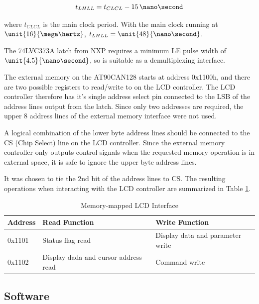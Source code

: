 
\begin{equation}
t_{LHLL}=t_{CLCL}-15\, \nano\second
\end{equation}

where $t_{CLCL}$ is the main clock period. With the main clock running at $\unit{16}{\mega\hertz}$, $t_{LHLL}=\unit{48}{\nano\second}$.


The 74LVC373A latch from NXP requires a minimum LE pulse width of $\unit{4.5}{\nano\second}$, so is suitable as a demultiplexing interface.

The external memory on the AT90CAN128 starts at address 0x1100h, and there are two possible registers to read/write to on the LCD controller. The LCD controller therefore has it's single address select pin connected to the LSB of the address lines output from the latch. Since only two addresses are required, the upper 8 address lines of the external memory interface were not used.

A logical combination of the lower byte address lines should be connected to the CS (Chip Select) line on the LCD controller. Since the external memory controller only outputs control signals when the requested memory operation is in external space, it is safe to ignore the upper byte address lines.


It was chosen to tie the 2nd bit of the address lines to CS. The resulting operations when interacting with the LCD controller are summarized in Table \ref{tab:lcd_memory_map}.

\begin{table}
\caption{Memory-mapped LCD Interface}
\label{tab:lcd_memory_map}
\centering{}
\begin{tabular}{|l|l|l|}
\hline 
Address  & Read Function  & Write Function\tabularnewline
\hline
\hline 
0x1101  & Status flag read  & Display data and parameter write\tabularnewline
\hline 
0x1102  & Display dada and cursor address read  & Command write\tabularnewline
\hline
\end{tabular}
\end{table}

\subsection{Software}

